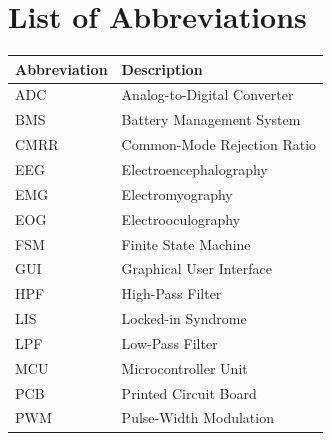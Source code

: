 \chapter*{List of Abbreviations}

\begin{longtable}{@{}p{3cm}p{10cm}@{}}
\toprule
\textbf{Abbreviation} & \textbf{Description} \\
\midrule
\endhead
ADC   & Analog-to-Digital Converter \\
BMS   & Battery Management System \\
CMRR  & Common-Mode Rejection Ratio \\
EEG   & Electroencephalography \\
EMG   & Electromyography \\
EOG   & Electrooculography \\
FSM   & Finite State Machine \\
GUI   & Graphical User Interface \\
HPF   & High-Pass Filter \\
LIS   & Locked-in Syndrome \\
LPF   & Low-Pass Filter \\
MCU   & Microcontroller Unit \\
PCB   & Printed Circuit Board \\
PWM   & Pulse-Width Modulation \\
\bottomrule
\end{longtable}
